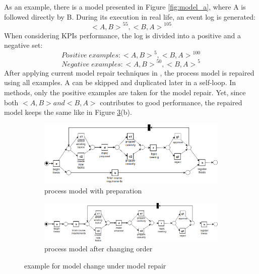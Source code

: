 As an example, there is a model presented in Figure \ref{fig:model_a}, where A is followed directly by B. During its execution in real life, an event log is generated: 
\[{ <A, B> }^{55}  , {<B, A>}^{105} \] 
When considering KPIs performance, the log is divided into a positive and a negative set: 
\[ Positive \;  examples: { <A, B> }^{5}  , {<B, A>}^{100} \] 
\[ Negative \; examples: { <A, B> }^{50}  , {<B, A>}^{5} \]  
After applying current model repair techniques in \cite{fahland2015model}, the process model is repaired using all examples. A can be skipped and duplicated later in a self-loop. In \cite{dees2017enhancing} methods, only the positive examples are taken for the model repair. Yet, since both $<A,B> and <B,A>$ contributes to good performance,  the repaired model keeps the same like in Figure \ref{fig:model_examples}(b).
\begin{figure}[htp]
	\centering
	
	\hfill
	
	\begin{subfigure}[b]{\textwidth}
		\centering
		\includegraphics[width=\linewidth]{figures/introduction/Thesis-PN-Example-with-preparation.png}
		\caption{process model with preparation}
		\label{fig:model_b}
	\end{subfigure}
	\hfill
	\begin{subfigure}[b]{\textwidth}
		\centering
		\includegraphics[width=01.0\linewidth]{figures/introduction/Thesis-PN-Example-change-order.png}
		\caption{process model after changing order}
		\label{fig:model_c}
	\end{subfigure}
	
	\caption{example for model change under model repair}
	\label{fig:model_examples}
\end{figure}

